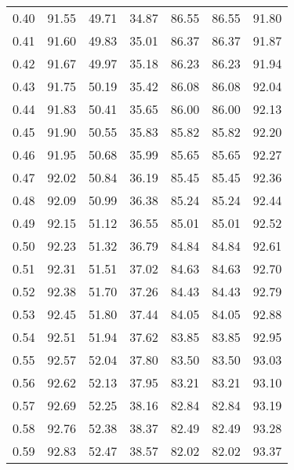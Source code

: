 \begin{tabular}{|c|c|c|c|c|c|c|}
      0.40 &     91.55 &     49.71 &      34.87 &   86.55 &      86.55 &         91.80 \\
      0.41 &     91.60 &     49.83 &      35.01 &   86.37 &      86.37 &         91.87 \\
      0.42 &     91.67 &     49.97 &      35.18 &   86.23 &      86.23 &         91.94 \\
      0.43 &     91.75 &     50.19 &      35.42 &   86.08 &      86.08 &         92.04 \\
      0.44 &     91.83 &     50.41 &      35.65 &   86.00 &      86.00 &         92.13 \\
      0.45 &     91.90 &     50.55 &      35.83 &   85.82 &      85.82 &         92.20 \\
      0.46 &     91.95 &     50.68 &      35.99 &   85.65 &      85.65 &         92.27 \\
      0.47 &     92.02 &     50.84 &      36.19 &   85.45 &      85.45 &         92.36 \\
      0.48 &     92.09 &     50.99 &      36.38 &   85.24 &      85.24 &         92.44 \\
      0.49 &     92.15 &     51.12 &      36.55 &   85.01 &      85.01 &         92.52 \\
      0.50 &     92.23 &     51.32 &      36.79 &   84.84 &      84.84 &         92.61 \\
      0.51 &     92.31 &     51.51 &      37.02 &   84.63 &      84.63 &         92.70 \\
      0.52 &     92.38 &     51.70 &      37.26 &   84.43 &      84.43 &         92.79 \\
      0.53 &     92.45 &     51.80 &      37.44 &   84.05 &      84.05 &         92.88 \\
      0.54 &     92.51 &     51.94 &      37.62 &   83.85 &      83.85 &         92.95 \\
      0.55 &     92.57 &     52.04 &      37.80 &   83.50 &      83.50 &         93.03 \\
      0.56 &     92.62 &     52.13 &      37.95 &   83.21 &      83.21 &         93.10 \\
      0.57 &     92.69 &     52.25 &      38.16 &   82.84 &      82.84 &         93.19 \\
      0.58 &     92.76 &     52.38 &      38.37 &   82.49 &      82.49 &         93.28 \\
      0.59 &     92.83 &     52.47 &      38.57 &   82.02 &      82.02 &         93.37 \\

\end{tabular}
